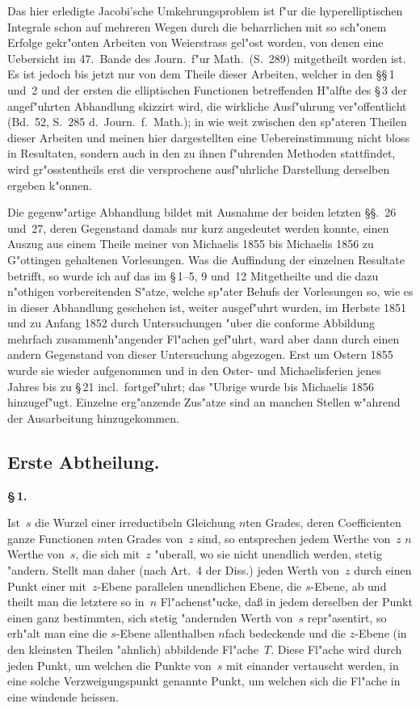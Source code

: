 \documentclass[12pt,a4paper]{book}
\theoremstyle{definition}
\theoremstyle{remark}
\begin{document}
Das hier erledigte Jacobi'sche Umkehrungsproblem ist f"ur die
hyperelliptischen Integrale schon auf mehreren Wegen durch die beharrlichen
mit so sch"onem Erfolge gekr"onten Arbeiten von Weierstrass gel"ost worden,
von denen eine Uebersicht im 47.\ Bande des Journ.\ f"ur Math.\ (S.~289)
mitgetheilt worden ist. Es ist jedoch bis jetzt nur von dem Theile dieser
Arbeiten, welcher in den \S\S\,1 und~2 und der ersten die elliptischen
Functionen betreffenden H"alfte des \S\,3 der angef"uhrten Abhandlung
skizzirt wird, die wirkliche Ausf"uhrung ver"offentlicht (Bd.~52, S.~285
d.\ Journ.\ f.\ Math.); in wie weit zwischen den sp"ateren Theilen dieser
Arbeiten und meinen hier dargestellten eine Uebereinstimmung nicht bloss
in Resultaten, sondern auch in den zu ihnen f"uhrenden Methoden stattfindet,
wird gr"osstentheils erst die versprochene ausf"uhrliche Darstellung derselben
ergeben k"onnen.

Die gegenw"artige Abhandlung bildet mit Ausnahme der beiden letzten
\S\S.\ 26 und~27, deren Gegenstand damals nur kurz angedeutet werden
konnte, einen Auszug aus einem Theile meiner von Michaelis 1855 bis
Michaelis 1856 zu G"ottingen gehaltenen Vorlesungen. Was die Auffindung
der einzelnen Resultate betrifft, so wurde ich auf das im \S\,1--5, 9 und~12
Mitgetheilte und die dazu n"othigen vorbereitenden S"atze, welche sp"ater
Behufs der Vorlesungen so, wie es in dieser Abhandlung geschehen ist,
weiter ausgef"uhrt wurden, im Herbste 1851 und zu Anfang 1852 durch
Untersuchungen "uber die conforme Abbildung mehrfach zusammenh"angender
Fl"achen gef"uhrt, ward aber dann durch einen andern Gegenstand von dieser
Untersuchung abgezogen. Erst um Ostern 1855 wurde sie wieder aufgenommen
und in den Oster- und Michaelisferien jenes Jahres bis zu \S\,21 incl.\ fortgef"uhrt; das "Ubrige wurde bis Michaelis 1856 hinzugef"ugt. Einzelne
erg"anzende Zus"atze sind an manchen Stellen w"ahrend der Ausarbeitung
hinzugekommen.

\newpage
\subsection*{Erste Abtheilung.}

\medskip
\textbf{\S\,1.}

Ist~$s$ die Wurzel einer irreductibeln Gleichung $n$ten Grades, deren
Coefficienten ganze Functionen $m$ten Grades von~$z$ sind, so entsprechen
jedem Werthe von~$z$ $n$ Werthe von~$s$, die sich mit~$z$ "uberall, wo sie
nicht unendlich werden, stetig "andern. Stellt man daher (nach Art.\ 4
der Diss.) jeden Werth von~$z$ durch einen Punkt einer mit~$z$-Ebene
parallelen unendlichen Ebene, die $s$-Ebene, ab und theilt man die letztere
so in~$n$ Fl"achenst"ucke, da\ss{} in jedem derselben der Punkt einen ganz
bestimmten, sich stetig "andernden Werth von~$s$ repr"asentirt, so erh"alt
man eine die $s$-Ebene allenthalben $n$fach bedeckende und die $z$-Ebene
(in den kleinsten Theilen "ahnlich) abbildende Fl"ache~$T$. Diese Fl"ache
wird durch jeden Punkt, um welchen die Punkte von~$s$ mit einander
vertauscht werden, in eine solche Verzweigungspunkt genannte Punkt,
um welchen sich die Fl"ache in eine windende heissen.
\end{document}
